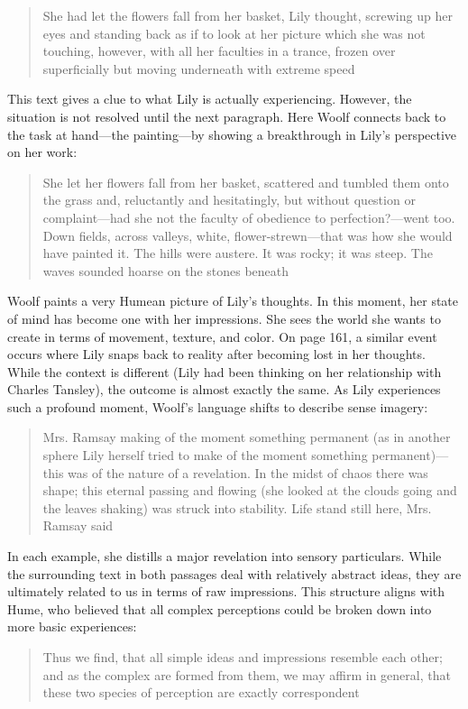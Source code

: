 \blockcquote[][201]{woolf_81}[.]{She had let the flowers fall from her basket, Lily thought, screwing up her eyes and standing back as if to look at her picture which she was not touching, however, with all her faculties in a trance, frozen over superficially but moving underneath with extreme speed}

This text gives a clue to what Lily is actually experiencing. However, the situation is not resolved until the next paragraph. Here Woolf connects back to the task at hand—the painting—by showing a breakthrough in Lily's perspective on her work:

\blockcquote[][201]{woolf_81}[.]{She let her flowers fall from her basket, scattered and tumbled them onto the grass and, reluctantly and hesitatingly, but without question or complaint—had she not the faculty of obedience to perfection?—went too. Down fields, across valleys, white, flower-strewn—that was how she would have painted it. The hills were austere. It was rocky; it was steep. The waves sounded hoarse on the stones beneath}

Woolf paints a very Humean picture of Lily's thoughts. In this moment, her state of mind has become one with her impressions. She sees the world she wants to create in terms of movement, texture, and color. On page 161, a similar event occurs where Lily snaps back to reality after becoming lost in her thoughts. While the context is different (Lily had been thinking on her relationship with Charles Tansley), the outcome is almost exactly the same. As Lily experiences such a profound moment, Woolf's language shifts to describe sense imagery:

\blockcquote[][161]{woolf_81}[.]{Mrs. Ramsay making of the moment something permanent (as in another sphere Lily herself tried to make of the moment something permanent)—this was of the nature of a revelation. In the midst of chaos there was shape; this eternal passing and flowing (she looked at the clouds going and the leaves shaking) was struck into stability. Life stand still here, Mrs. Ramsay said}

In each example, she distills a major revelation into sensory particulars. While the surrounding text in both passages deal with relatively abstract ideas, they are ultimately related to us in terms of raw impressions. This structure aligns with Hume, who believed that all complex perceptions could be broken down into more basic experiences: 

\blockcquote[][4]{hume_78}[.]{Thus we find, that all simple ideas and impressions resemble each other; and as the complex are formed from them, we may affirm in general, that these two species of perception are exactly correspondent}

